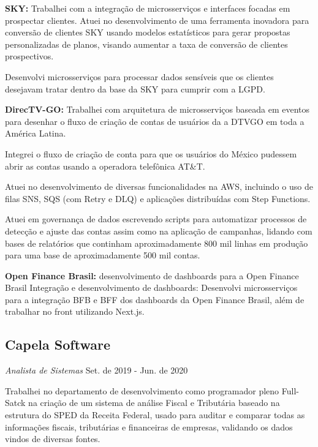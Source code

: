 \documentclass[a4paper,10pt]{article}
\begin{document}

\vspace{2mm} \textcolor{corSubSection}{\bfseries{SKY:}}
Trabalhei com a integração de microsserviços e interfaces focadas em prospectar clientes.
Atuei no desenvolvimento de uma ferramenta inovadora para conversão de clientes SKY
usando modelos estatísticos para gerar propostas personalizadas de planos,
visando aumentar a taxa de conversão de clientes prospectivos. 

Desenvolvi microsserviços para processar dados sensíveis que os clientes
desejavam tratar dentro da base da SKY para cumprir com a LGPD.

\vspace{2mm} \textcolor{corSubSection}{\bfseries{DirecTV-GO:}}
Trabalhei com arquitetura de microsserviços baseada em eventos
para desenhar o fluxo de criação de contas de usuários
da a DTVGO em toda a América Latina.

Integrei o fluxo de criação de conta para que os usuários do México
pudessem abrir as contas usando a operadora telefônica AT\&T.

Atuei no desenvolvimento de diversas funcionalidades na AWS,
incluindo o uso de filas SNS, SQS (com Retry e DLQ)
e aplicações distribuídas com Step Functions.

Atuei em governança de dados escrevendo scripts
para automatizar processos de detecção e ajuste das contas
assim como na aplicação de campanhas,
lidando com bases de relatórios que continham aproximadamente
800 mil linhas em produção para uma base de aproximadamente 500 mil contas.

\vspace{2mm} \textcolor{corSubSection}{\bfseries{Open Finance Brasil:}}
desenvolvimento de dashboards para a Open Finance Brasil
Integração e desenvolvimento de dashboards: Desenvolvi microsserviços para a integração BFB e BFF dos dashboards da Open Finance Brasil, além de trabalhar no front utilizando Next.js.

\subsection*{Capela Software}
\textcolor{corSubSection}{\emph{Analista de Sistemas}}
\hfill\textcolor{corSubSection}{Set. de 2019 - Jun. de 2020}

Trabalhei no departamento de desenvolvimento como programador pleno Full-Satck na criação de um sistema de análise Fiscal e Tributária baseado na estrutura do SPED da Receita Federal, usado para auditar e comparar todas as informações fiscais, tributárias e financeiras de empresas, validando os dados vindos de diversas fontes.
\end{document}
